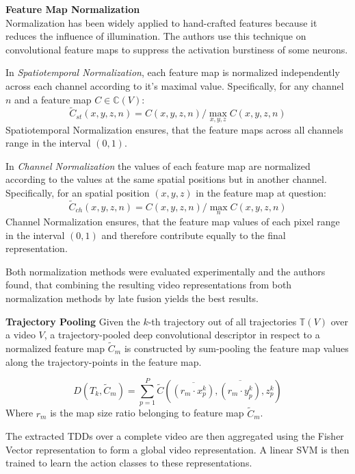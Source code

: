 \textbf{Feature Map Normalization}\\
Normalization has been widely applied to hand-crafted features because it reduces the influence of illumination.
The authors use this technique on convolutional feature maps to suppress the activation burstiness of some neurons.

In \textit{Spatiotemporal Normalization}, each feature map is normalized independently across each channel according to it's maximal value.
Specifically, for any channel $n$ and a feature map $C \in \mathbb{C}(V)$:
\begin{equation*}
    \tilde{C}_{st}(x,y,z,n) = C(x,y,z,n) / \max_{x,y,z} C(x,y,z,n)
\end{equation*}
Spatiotemporal Normalization ensures, that the feature maps across all channels range in the interval $(0,1)$.

In \textit{Channel Normalization} the values of each feature map are normalized according to the values at the same spatial positions but in another channel.
Specifically, for an spatial position $(x,y,z)$ in the feature map at question:
\begin{equation*}
    \tilde{C}_{ch}(x,y,z,n) = C(x,y,z,n) / \max_{n} C(x,y,z,n)
\end{equation*}
Channel Normalization ensures, that the feature map values of each pixel range in the interval $(0,1)$ and therefore contribute equally to the final representation.

Both normalization methods were evaluated experimentally and the authors found, that combining the resulting video representations from both normalization methods by late fusion yields the best results.

\textbf{Trajectory Pooling}
Given the $k$-th trajectory out of all trajectories $\mathbb{T}(V)$ over a video $V$, a trajectory-pooled deep convolutional descriptor in respect to a normalized feature map $\tilde{C}_m$ is constructed by sum-pooling the feature map values along the trajectory-points in the feature map.

\begin{equation*}
    D(T_k, \tilde{C}_m) = \sum_{p=1}^P \tilde{C}(\overline{(r_m \cdot x_p^k)}, \overline{(r_m \cdot y_p^k)}, z_p^k)
\end{equation*}
Where $r_m$ is the map size ratio belonging to feature map $\tilde{C}_m$.

The extracted TDDs over a complete video are then aggregated using the Fisher Vector representation \cite{sanchez_image_2013} to form a global video representation.
A linear SVM is then trained to learn the action classes to these representations.

